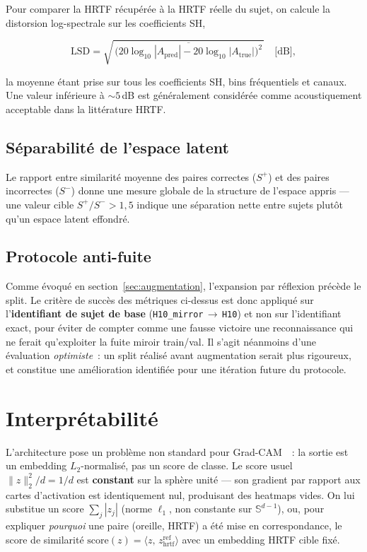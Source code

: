 \documentclass[12pt, a4paper]{article}
\begin{document}
Pour comparer la HRTF récupérée à la HRTF réelle du sujet, on calcule la
distorsion log-spectrale sur les coefficients SH,

\begin{equation}
    \mathrm{LSD} = \sqrt{\,\overline{\bigl(20\log_{10}|A_{\mathrm{pred}}|
    - 20\log_{10}|A_{\mathrm{true}}|\bigr)^2}\,} \quad \text{[dB]},
\end{equation}

la moyenne étant prise sur tous les coefficients SH, bins fréquentiels et
canaux. Une valeur inférieure à $\sim5$\,dB est généralement considérée
comme acoustiquement acceptable dans la littérature HRTF.

\subsection{Séparabilité de l'espace latent}

Le rapport entre similarité moyenne des paires correctes ($S^+$) et des
paires incorrectes ($S^-$) donne une mesure globale de la structure de
l'espace appris — une valeur cible $S^+/S^- > 1{,}5$ indique une séparation
nette entre sujets plutôt qu'un espace latent effondré.

\subsection{Protocole anti-fuite}

Comme évoqué en section~\ref{sec:augmentation}, l'expansion par réflexion
précède le split. Le critère de succès des métriques ci-dessus est donc
appliqué sur l'\textbf{identifiant de sujet de base}
(\texttt{H10\_mirror}\,$\to$\,\texttt{H10}) et non sur l'identifiant exact,
pour éviter de compter comme une fausse victoire une reconnaissance qui ne
ferait qu'exploiter la fuite miroir train/val. Il s'agit néanmoins d'une
évaluation \emph{optimiste}~: un split réalisé avant augmentation serait
plus rigoureux, et constitue une amélioration identifiée pour une itération
future du protocole.

\section{Interprétabilité}
\label{sec:gradcam}

L'architecture pose un problème non standard pour Grad-CAM~\cite{Selvaraju17}~:
la sortie est un embedding $L_2$-normalisé, pas un score de classe. Le
score usuel $\lVert z \rVert_2^2 / d = 1/d$ est \textbf{constant} sur la
sphère unité — son gradient par rapport aux cartes d'activation est
identiquement nul, produisant des heatmaps vides. On lui substitue un score
$\sum_j |z_j|$ (norme $\ell_1$, non constante sur $\mathbb{S}^{d-1}$), ou,
pour expliquer \emph{pourquoi} une paire (oreille, HRTF) a été mise en
correspondance, le score de similarité
$\mathrm{score}(z) = \langle z,\, z_{\mathrm{hrtf}}^{\mathrm{ref}}\rangle$
avec un embedding HRTF cible fixé.
\end{document}
